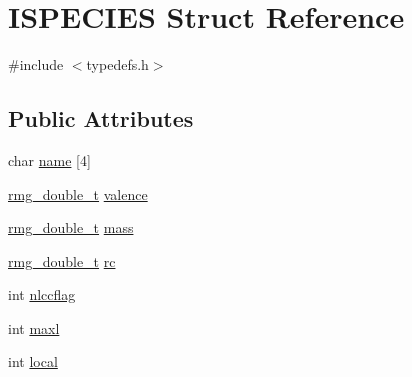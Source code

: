 \hypertarget{struct_i_s_p_e_c_i_e_s}{\section{I\-S\-P\-E\-C\-I\-E\-S Struct Reference}
\label{struct_i_s_p_e_c_i_e_s}
}


{\ttfamily \#include $<$typedefs.\-h$>$}

\subsection*{Public Attributes}
\begin{DoxyCompactItemize}
\item 
char \hyperlink{struct_i_s_p_e_c_i_e_s_ad7825900213436986358d2fb66e8ed92}{name} \mbox{[}4\mbox{]}
\item 
\hyperlink{rmgtypes_8h_aaa16921c14f121c56eaa42390a340db8}{rmg\-\_\-double\-\_\-t} \hyperlink{struct_i_s_p_e_c_i_e_s_a9ea5177c4519b0ee21950ff2cff15187}{valence}
\item 
\hyperlink{rmgtypes_8h_aaa16921c14f121c56eaa42390a340db8}{rmg\-\_\-double\-\_\-t} \hyperlink{struct_i_s_p_e_c_i_e_s_a027bea73176b41a47d1ef64e88e73295}{mass}
\item 
\hyperlink{rmgtypes_8h_aaa16921c14f121c56eaa42390a340db8}{rmg\-\_\-double\-\_\-t} \hyperlink{struct_i_s_p_e_c_i_e_s_a7d979feeaf3384f236b8053bd1158cdf}{rc}
\item 
int \hyperlink{struct_i_s_p_e_c_i_e_s_ac9a0575c5ad036e57132c18fe26e592a}{nlccflag}
\item 
int \hyperlink{struct_i_s_p_e_c_i_e_s_ae9189f2465cbf7b06022c60ff0a9430f}{maxl}
\item 
int \hyperlink{struct_i_s_p_e_c_i_e_s_a1402f86199db95ba01663b2f50f2e465}{local}
\end{DoxyCompactItemize}


